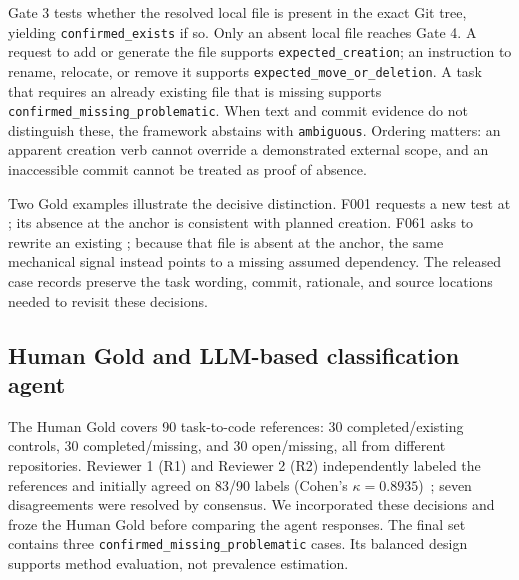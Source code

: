 \documentclass[10pt,conference]{IEEEtran}
\begin{document}
Gate 3 tests whether the resolved local file is present in the exact Git tree, yielding \texttt{confirmed\_exists} if so. Only an absent local file reaches Gate 4. A request to add or generate the file supports \texttt{expected\_creation}; an instruction to rename, relocate, or remove it supports \texttt{expected\_move\_or\_deletion}. A task that requires an already existing file that is missing supports \texttt{confirmed\_missing\_problematic}. When text and commit evidence do not distinguish these, the framework abstains with \texttt{ambiguous}. Ordering matters: an apparent creation verb cannot override a demonstrated external scope, and an inaccessible commit cannot be treated as proof of absence.

Two Gold examples illustrate the decisive distinction. F001 requests a new test at ; its absence at the anchor is consistent with planned creation. F061 asks to rewrite an existing ; because that file is absent at the anchor, the same mechanical signal instead points to a missing assumed dependency. The released case records preserve the task wording, commit, rationale, and source locations needed to revisit these decisions.

\subsection{Human Gold and LLM-based classification agent}
The Human Gold covers 90 task-to-code references: 30 completed/existing controls, 30 completed/missing, and 30 open/missing, all from different repositories. Reviewer 1 (R1) and Reviewer 2 (R2) independently labeled the references and initially agreed on 83/90 labels (Cohen's $\kappa=0.8935$)~\cite{cohen1960}; seven disagreements were resolved by consensus. We incorporated these decisions and froze the Human Gold before comparing the agent responses. The final set contains three \texttt{confirmed\_missing\_problematic} cases. Its balanced design supports method evaluation, not prevalence estimation.
\end{document}
